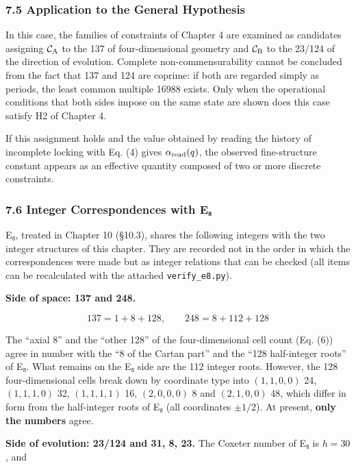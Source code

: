 \documentclass[
  a4paper,
]{article}
\begin{document}
\subsubsection{7.5 Application to the General
Hypothesis}\label{application-to-the-general-hypothesis}

In this case, the families of constraints of Chapter 4 are examined as
candidates assigning \(\mathcal C_{\rm A}\) to the 137 of
four-dimensional geometry and \(\mathcal C_{\rm B}\) to the 23/124 of
the direction of evolution. Complete non-commensurability cannot be
concluded from the fact that 137 and 124 are coprime: if both are
regarded simply as periods, the least common multiple 16988 exists. Only
when the operational conditions that both sides impose on the same state
are shown does this case satisfy H2 of Chapter 4.

If this assignment holds and the value obtained by reading the history
of incomplete locking with Eq. (4) gives \(\alpha_{\rm read}(q)\), the
observed fine-structure constant appears as an effective quantity
composed of two or more discrete constraints.

\subsubsection{7.6 Integer Correspondences with
E₈}\label{integer-correspondences-with-eux2088}

E₈, treated in Chapter 10 (§10.3), shares the following integers with
the two integer structures of this chapter. They are recorded not in the
order in which the correspondences were made but as integer relations
that can be checked (all items can be recalculated with the attached
\texttt{verify\_\allowbreak{}e8.py}).

\textbf{Side of space: 137 and 248.}

\[
137=1+8+128,\qquad 248=8+112+128
\tag{12a}
\]

The ``axial 8'' and the ``other 128'' of the four-dimensional cell count
(Eq. (6)) agree in number with the ``8 of the Cartan part'' and the
``128 half-integer roots'' of E₈. What remains on the E₈ side are the
112 integer roots. However, the 128 four-dimensional cells break down by
coordinate type into \((1,1,0,0)\) 24, \((1,1,1,0)\) 32, \((1,1,1,1)\)
16, \((2,0,0,0)\) 8 and \((2,1,0,0)\) 48, which differ in form from the
half-integer roots of E₈ (all coordinates \(\pm1/2\)). At present,
\textbf{only the numbers} agree.

\textbf{Side of evolution: 23/124 and 31, 8, 23.} The Coxeter number of
E₈ is \(h=30\), and
\end{document}
